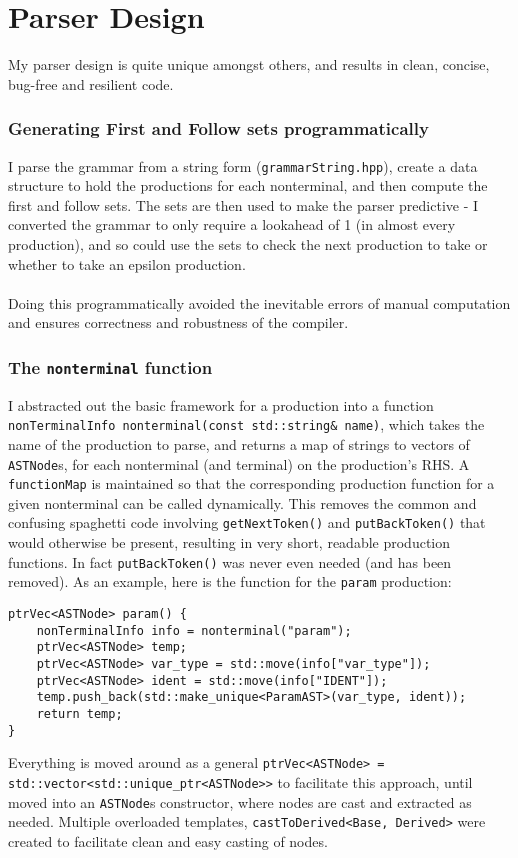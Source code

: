 \documentclass[10pt,a4paper]{article}
\newcommand{\code}[1]{\lstinline!#1!}
\begin{document}
\section*{Parser Design}
My parser design is quite unique amongst others, and results in clean, concise, bug-free and resilient code. 
\subsubsection*{Generating First and Follow sets programmatically}
I parse the grammar from a string form (\code{grammarString.hpp}), create a data structure to hold the productions for each nonterminal, and then compute the first and follow sets. The sets are then used to make the parser predictive - I converted the grammar to only require a lookahead of 1 (in almost every production), and so could use the sets to check the next production to take or whether to take an epsilon production.\\\\
Doing this programmatically avoided the inevitable errors of manual computation and ensures correctness and robustness of the compiler.
\subsubsection*{The \code{nonterminal} function}
I abstracted out the basic framework for a production into a function \code{nonTerminalInfo nonterminal(const std::string& name)}, which takes the name of the production to parse, and returns a map of strings to vectors of \code{ASTNode}s, for each nonterminal (and terminal) on the production's RHS. A \code{functionMap} is maintained so that the corresponding production function for a given nonterminal can be called dynamically. This removes the common and confusing spaghetti code involving \code{getNextToken()} and \code{putBackToken()} that would otherwise be present, resulting in very short, readable production functions. In fact \code{putBackToken()} was never even needed (and has been removed). As an example, here is the function for the \code{param} production:
\begin{lstlisting}[]
ptrVec<ASTNode> param() {
    nonTerminalInfo info = nonterminal("param");
    ptrVec<ASTNode> temp;
    ptrVec<ASTNode> var_type = std::move(info["var_type"]);
    ptrVec<ASTNode> ident = std::move(info["IDENT"]);
    temp.push_back(std::make_unique<ParamAST>(var_type, ident));
    return temp;
}
\end{lstlisting}
Everything is moved around as a general \code{ptrVec<ASTNode> = std::vector<std::unique_ptr<ASTNode>>} to facilitate this approach, until moved into an \code{ASTNode}s constructor, where nodes are cast and extracted as needed. Multiple overloaded templates, \code{castToDerived<Base, Derived>} were created to facilitate clean and easy casting of nodes.
\end{document}
